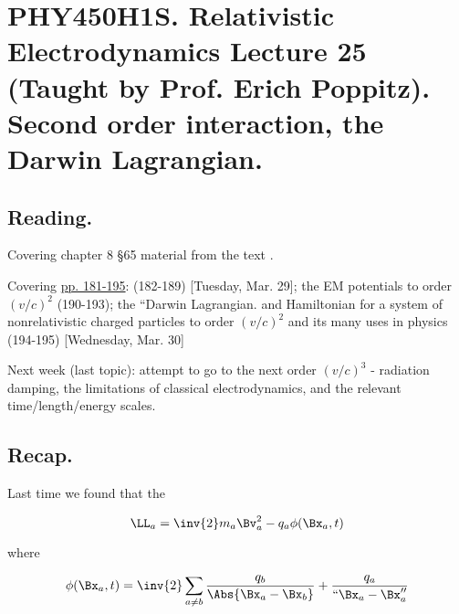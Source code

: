 
%

\chapter{PHY450H1S.  Relativistic Electrodynamics Lecture 25 (Taught by Prof. Erich Poppitz).  Second order interaction, the Darwin Lagrangian.}
\label{chap:relativisticElectrodynamicsL25}
{}
\date{Mar 31, 2011}

\beginArtNoToc

\section{Reading.}

Covering chapter 8 \S 65 material from the text \cite{landau1980classical}.

Covering \href{http://www.physics.utoronto.ca/~poppitz/epoppitz/PHY450_files/RelEMpp181-195.pdf}{pp. 181-195}: (182-189) [Tuesday, Mar. 29]; the EM potentials to order $(v/c)^2$ (190-193); the ``Darwin Lagrangian.  and Hamiltonian for a system of nonrelativistic charged particles to order $(v/c)^2$ and its many uses in physics (194-195) [Wednesday, Mar. 30]

Next week (last topic): attempt to go to the next order $(v/c)^3$ - radiation damping, the limitations of classical electrodynamics, and the relevant time/length/energy scales.

\section{Recap.}

Last time we found that the 

\begin{equation}\label{eqn:relativisticElectrodynamicsL25:n}
\LL_a = \inv{2} m_a \Bv_a^2 - q_a \phi(\Bx_a, t)
\end{equation}

where

\begin{equation}\label{eqn:relativisticElectrodynamicsL25:n}
\phi(\Bx_a, t) = \inv{2} \sum_{a \ne b} \frac{q_b }{\Abs{\Bx_a - \Bx_b}}
+ \frac{q_a}{``\Bx_a - \Bx_a''}
\end{equation}

